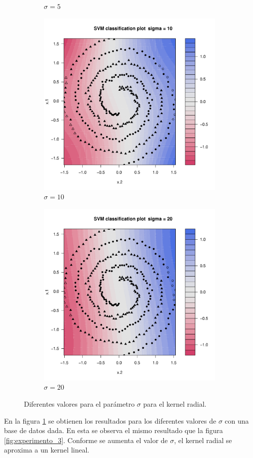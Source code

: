 \begin{figure}[H]
\begin{subfigure}{0.24\linewidth}
		\caption{$\sigma=5$}
	\end{subfigure}
	\begin{subfigure}{0.24\linewidth}
		\includegraphics[width=1\linewidth]{Graphics/Problema_01/Experiment_04_3.pdf}
		\caption{$\sigma=10$}
	\end{subfigure}
	\begin{subfigure}{0.24\linewidth}
		\includegraphics[width=1\linewidth]{Graphics/Problema_01/Experiment_04_4.pdf}
		\caption{$\sigma=20$}
	\end{subfigure}
	\caption{Diferentes valores para el parámetro $\sigma$ para el kernel radial.}
	\label{fig:experimento_4}
\end{figure}

En la figura \ref{fig:experimento_4} se obtienen los resultados para los diferentes valores de $\sigma$ con una base de datos dada. En esta se observa el mismo resultado que la figura \ref{fig:experimento_3}. Conforme se aumenta el valor de $\sigma$, el kernel radial se aproxima a un kernel lineal.